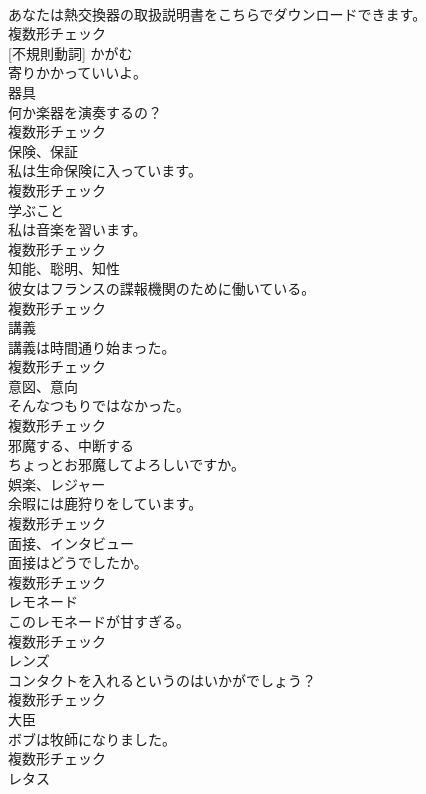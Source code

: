 \documentclass[8pt]{extreport}
\begin{document}
\begin{CJK}{UTF8}{min}
\\	あなたは熱交換器の取扱説明書をこちらでダウンロードできます。	
\\	複数形チェック
\\	[動詞] [不規則動詞]	かがむ	
\\	寄りかかっていいよ。	
\\	[名詞]	器具	
\\	何か楽器を演奏するの？	
\\	複数形チェック
\\	[名詞]	保険、保証	
\\	私は生命保険に入っています。	
\\	複数形チェック
\\	[名詞]	学ぶこと	
\\	私は音楽を習います。	
\\	複数形チェック
\\	[名詞]	知能、聡明、知性	
\\	彼女はフランスの諜報機関のために働いている。	
\\	複数形チェック
\\	[名詞]	講義	
\\	講義は時間通り始まった。	
\\	複数形チェック
\\	[名詞]	意図、意向	
\\	そんなつもりではなかった。	
\\	複数形チェック
\\	[動詞]	邪魔する、中断する	
\\	ちょっとお邪魔してよろしいですか。	
\\	[名詞]	娯楽、レジャー	
\\	余暇には鹿狩りをしています。	
\\	複数形チェック
\\	[名詞]	面接、インタビュー	
\\	面接はどうでしたか。	
\\	複数形チェック
\\	[名詞]	レモネード	
\\	このレモネードが甘すぎる。	
\\	複数形チェック
\\	[名詞]	レンズ	
\\	コンタクトを入れるというのはいかがでしょう？	
\\	複数形チェック
\\	[名詞]	大臣	
\\	ボブは牧師になりました。	
\\	複数形チェック
\\	[名詞]	レタス	

\end{CJK}
\end{document}
